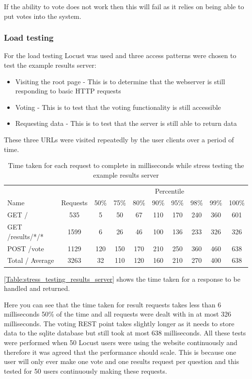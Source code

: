 If the ability to vote does not work then this will fail as it relies on being able to put votes into the system.

\subsubsection{Load testing}

For the load testing Locust was used and three access patterns were chosen to test the example results server:

\begin{itemize}
\item Visiting the root page - This is to determine that the webserver is still responding to basic HTTP requests
\item Voting - This is to test that the voting functionality is still accessible
\item Requesting data - This is to test that the server is still able to return data
\end{itemize}

These three URLs were visited repeatedly by the user clients over a period of time.

\begin{table}
\caption{Time taken for each request to complete in milliseconds while stress testing the example results server}
\begin{tabular}{l c  c c c c c c c c }
\hline 
& & \multicolumn{8}{c}{Percentile} \\
Name & Requests & 50\% & 75\% & 80\% & 90\% & 95\% & 98\% & 99\% & 100\% \\ 
\hline 
GET / & 535 & 5 & 50 & 67 & 110 & 170 & 240 & 360 & 601 \\ 
\hline 
GET /results/*/* & 1599 & 6 & 26 & 46 & 100 & 136 & 233 & 326 & 326 \\ 
\hline 
POST /vote & 1129 & 120 & 150 & 170 & 210 & 250 & 360 & 460 & 638 \\ 
\hline 
Total / Average & 3263 & 32 & 110 & 120 & 160 & 210 & 270 & 400 & 638 \\ 
\hline 
\end{tabular}
\label{Table:stress_testing_results_server}
\end{table}

\autoref{Table:stress_testing_results_server} shows the time taken for a response to be handled and returned.

Here you can see that the time taken for result requests takes less than 6 milliseconds 50\% of the time and all requests were dealt with in at most 326 milliseconds. The voting \gls{REST} point takes slightly longer as it needs to store data to the sqlite database but still took at most 638 milliseconds. All these tests were performed when 50 Locust users were using the website continuously and therefore it was agreed that the performance should scale. This is because one user will only ever make one vote and one results request per question and this tested for 50 users continuously making these requests.

